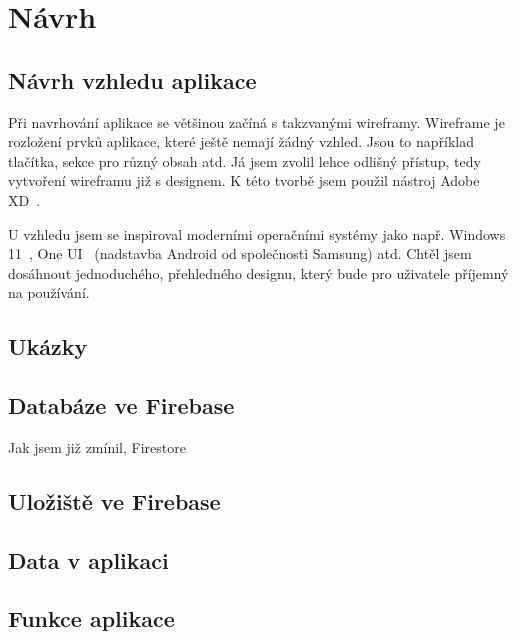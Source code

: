 
\chapter{Návrh}

\section{Návrh vzhledu aplikace}

Při navrhování aplikace se většinou začíná s takzvanými wireframy. Wireframe je rozložení prvků aplikace, které ještě
nemají žádný vzhled. Jsou to například tlačítka, sekce pro různý obsah atd. Já jsem zvolil lehce odlišný přístup, tedy
vytvoření wireframu již s designem. K této tvorbě jsem použil nástroj Adobe XD~\cite{AdobeXD}.

U vzhledu jsem se inspiroval moderními operačními systémy jako např. Windows 11~\cite{Windows11}, One UI~\cite{OneUI}
(nadstavba Android od společnosti Samsung) atd.
Chtěl jsem dosáhnout jednoduchého, přehledného designu, který bude pro uživatele příjemný na používání.

\section{Ukázky}

\section{Databáze ve Firebase}
Jak jsem již zmínil, Firestore%

\section{Uložiště ve Firebase}

\section{Data v aplikaci}

\section{Funkce aplikace}
